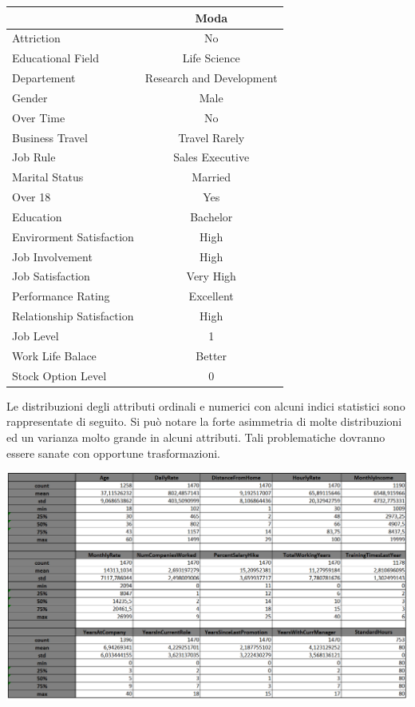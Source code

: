 \documentclass[a4paper,9pt]{article}
\begin{document}
\begin{center}
\begin{tabular}{lc}
\toprule
 &\bfseries Moda \\
\hline
\hline
\rowcolor[gray]{0.9}
Attriction & No\\
Educational Field & Life Science\\
\rowcolor[gray]{0.9}
Departement & Research and Development\\
Gender & Male\\
\rowcolor[gray]{0.9}
Over Time & No\\
Business Travel & Travel Rarely\\
\rowcolor[gray]{0.9}
Job Rule & Sales Executive\\
Marital Status & Married \\
\rowcolor[gray]{0.9}
Over 18 & Yes\\ 
Education & Bachelor\\
\rowcolor[gray]{0.9}
Envirorment Satisfaction & High\\
Job Involvement & High\\
\rowcolor[gray]{0.9}
Job Satisfaction & Very High\\
Performance Rating & Excellent\\
\rowcolor[gray]{0.9}
Relationship Satisfaction & High\\
Job Level & 1\\
\rowcolor[gray]{0.9}
Work Life Balace & Better\\
Stock Option Level & 0\\
\bottomrule 
\end{tabular}
\end{center}
 
Le distribuzioni degli attributi ordinali e numerici con alcuni indici statistici sono rappresentate di seguito.
Si può notare la forte asimmetria di molte distribuzioni ed un varianza molto grande in alcuni attributi. Tali problematiche dovranno essere sanate con opportune trasformazioni.

\begin{center}
\includegraphics[scale=1.1]{statistica.png}
\end{center}
\end{document}
